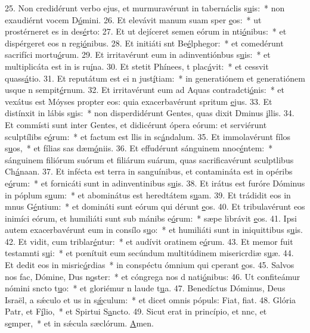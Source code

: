 25. Non credidérunt verbo ejus, et murmuravérunt in tabernáclis s\uline{u}is:~* non exaudiérnt vocem D\uline{ó}mini.
26. Et elevávit manum suam sper \uline{e}os:~* ut prostérneret es in des\uline{é}rto:
27. Et ut dejíceret semen eórum in nti\uline{ó}nibus:~* et dispérgeret eos n regi\uline{ó}nibus.
28. Et initiáti snt Be\uline{é}lphegor:~* et comedérunt sacrifíci mortu\uline{ó}rum.
29. Et irritavérunt eum in adinventiónbus s\uline{u}is:~* et multiplicáta est in is ru\uline{í}na.
30. Et stetit Phínees, t plac\uline{á}vit:~* et cessvit quass\uline{á}tio.
31. Et reputátum est ei n just\uline{í}tiam:~* in generatiónem et generatiónem usque n sempit\uline{é}rnum.
32. Et irritavérunt eum ad Aquas contradcti\uline{ó}nis:~* et vexátus est Móyses propter eos: quia exacerbavérunt spritum \uline{e}jus.
33. Et distínxit in lábis s\uline{u}is:~* non disperdidérunt Gentes, quas dixit Dminus \uline{i}llis.
34. Et commísti sunt inter Gentes, et didicérunt ópera eórum: et serviérunt sculptílibs e\uline{ó}rum:~* et factum est llis in sc\uline{á}ndalum.
35. Et immolavérunt fílos s\uline{u}os,~* et fílias sas dæm\uline{ó}niis.
36. Et effudérunt sánguinem nnoc\uline{é}ntem:~* sánguinem filiórum suórum et filiárum suárum, quas sacrificavérunt sculptlibus Ch\uline{á}naan.
37. Et infécta est terra in sanguínibus, et contamináta est in opéribs e\uline{ó}rum:~* et fornicáti sunt in adinventinibus s\uline{u}is.
38. Et irátus est furóre Dóminus in póplum s\uline{u}um:~* et abominátus est heredtátem s\uline{u}am.
39. Et trádidit eos in mnus G\uline{é}ntium:~* et domináti sunt eórum qui dérunt \uline{e}os.
40. Et tribulavérunt eos inimíci eórum, et humiliáti sunt sub mánibs e\uline{ó}rum:~* sæpe librávit \uline{e}os.
41. Ipsi autem exacerbavérunt eum in consílo s\uline{u}o:~* et humiliáti sunt in iniquittibus s\uline{u}is.
42. Et vidit, cum triblar\uline{é}ntur:~* et audívit oratinem e\uline{ó}rum.
43. Et memor fuit testamnti s\uline{u}i:~* et pœnítuit eum secúndum multitúdinem misericrdiæ s\uline{u}æ.
44. Et dedit eos in misric\uline{ó}rdias~* in conspéctu ómnium qui cperant \uline{e}os.
45. Salvos nos fac, Dómine, Dus n\uline{o}ster:~* et cóngrega nos d nati\uline{ó}nibus:
46. Ut confiteámur nómini sncto t\uline{u}o:~* et gloriémur n laude t\uline{u}a.
47. Benedíctus Dóminus, Deus Israël, a sǽculo et us in s\uline{ǽ}culum:~* et dicet omnis pópuls: Fiat, f\uline{i}at.
48. Glória Patr, et F\uline{í}lio,~* et Spirtui S\uline{a}ncto.
49. Sicut erat in princípio, et nnc, et s\uline{e}mper,~* et in sǽcula sæclórum. \uline{A}men.
